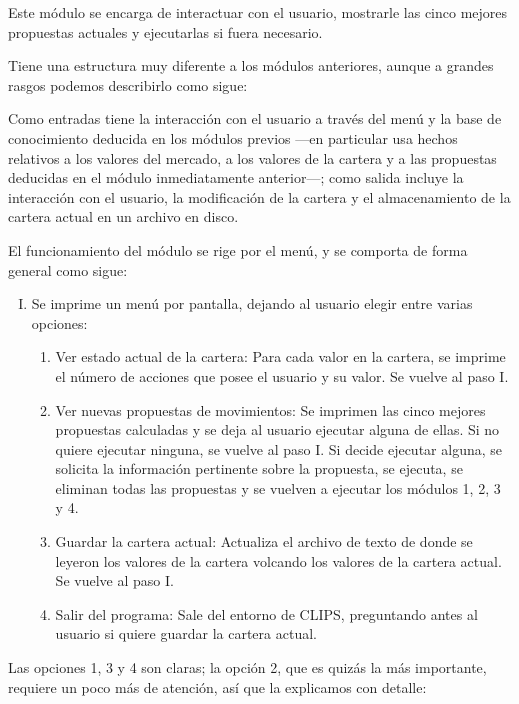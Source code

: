 \documentclass[a4paper, 11pt, titlepage]{article}
\begin{document}
    Este módulo se encarga de interactuar con el usuario, mostrarle las cinco mejores propuestas actuales y ejecutarlas si fuera necesario.

    Tiene una estructura muy diferente a los módulos anteriores, aunque a grandes rasgos podemos describirlo como sigue:

    Como entradas tiene la interacción con el usuario a través del menú y la base de conocimiento deducida en los módulos previos ---en particular usa hechos relativos a los valores del mercado, a los valores de la cartera y a las propuestas deducidas en el módulo inmediatamente anterior---; como salida incluye la interacción con el usuario, la modificación de la cartera y el almacenamiento de la cartera actual en un archivo en disco.

    El funcionamiento del módulo se rige por el menú, y se comporta de forma general como sigue:

    \begin{enumerate}[I.]
        \item Se imprime un menú por pantalla, dejando al usuario elegir entre varias opciones:
        \begin{enumerate}[1 ---]
            \item Ver estado actual de la cartera: Para cada valor en la cartera, se imprime el número de acciones que posee el usuario y su valor. Se vuelve al paso I.
            \item Ver nuevas propuestas de movimientos: Se imprimen las cinco mejores propuestas calculadas y se deja al usuario ejecutar alguna de ellas. Si no quiere ejecutar ninguna, se vuelve al paso I. Si decide ejecutar alguna, se solicita la información pertinente sobre la propuesta, se ejecuta, se eliminan todas las propuestas y se vuelven a ejecutar los módulos 1, 2, 3 y 4.
            \item Guardar la cartera actual: Actualiza el archivo de texto de donde se leyeron los valores de la cartera volcando los valores de la cartera actual. Se vuelve al paso I.
            \item Salir del programa: Sale del entorno de CLIPS, preguntando antes al usuario si quiere guardar la cartera actual.
        \end{enumerate}
    \end{enumerate}

    Las opciones 1, 3 y 4 son claras; la opción 2, que es quizás la más importante, requiere un poco más de atención, así que la explicamos con detalle:
\end{document}
